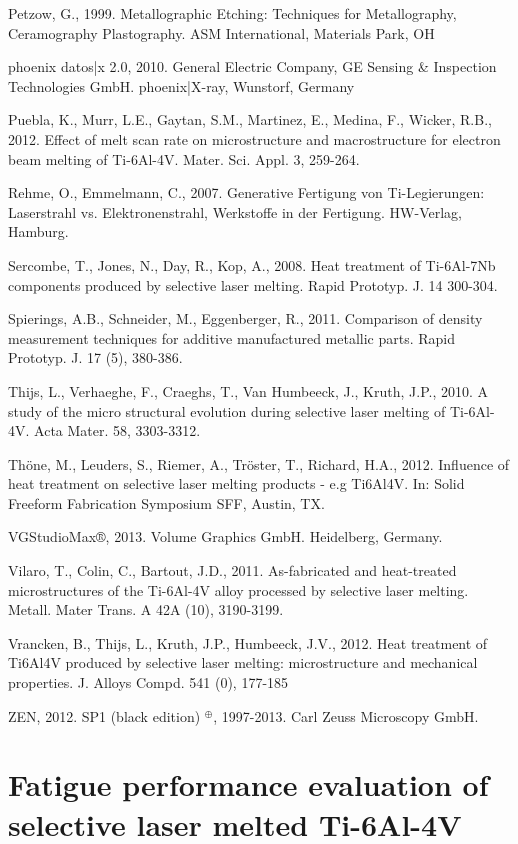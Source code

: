 \documentclass[10pt]{article}
\begin{document}
Petzow, G., 1999. Metallographic Etching: Techniques for Metallography, Ceramography Plastography. ASM International, Materials Park, $\mathrm{OH}$

phoenix datos|x 2.0, 2010. General Electric Company, GE Sensing \& Inspection Technologies GmbH. phoenix|X-ray, Wunstorf, Germany

Puebla, K., Murr, L.E., Gaytan, S.M., Martinez, E., Medina, F., Wicker, R.B., 2012. Effect of melt scan rate on microstructure and macrostructure for electron beam melting of Ti-6Al-4V. Mater. Sci. Appl. 3, 259-264.

Rehme, O., Emmelmann, C., 2007. Generative Fertigung von Ti-Legierungen: Laserstrahl vs. Elektronenstrahl, Werkstoffe in der Fertigung. HW-Verlag, Hamburg.

Sercombe, T., Jones, N., Day, R., Kop, A., 2008. Heat treatment of Ti-6Al-7Nb components produced by selective laser melting. Rapid Prototyp. J. 14 300-304.

Spierings, A.B., Schneider, M., Eggenberger, R., 2011. Comparison of density measurement techniques for additive manufactured metallic parts. Rapid Prototyp. J. 17 (5), 380-386.

Thijs, L., Verhaeghe, F., Craeghs, T., Van Humbeeck, J., Kruth, J.P., 2010. A study of the micro structural evolution during selective laser melting of Ti-6Al-4V. Acta Mater. 58, 3303-3312.

Thöne, M., Leuders, S., Riemer, A., Tröster, T., Richard, H.A., 2012. Influence of heat treatment on selective laser melting products - e.g Ti6Al4V. In: Solid Freeform Fabrication Symposium SFF, Austin, TX.

VGStudioMax®, 2013. Volume Graphics GmbH. Heidelberg, Germany.

Vilaro, T., Colin, C., Bartout, J.D., 2011. As-fabricated and heat-treated microstructures of the Ti-6Al-4V alloy processed by selective laser melting. Metall. Mater Trans. A 42A (10), 3190-3199.

Vrancken, B., Thijs, L., Kruth, J.P., Humbeeck, J.V., 2012. Heat treatment of Ti6Al4V produced by selective laser melting: microstructure and mechanical properties. J. Alloys Compd. 541 (0), 177-185

ZEN, 2012. SP1 (black edition) ${ }^{\oplus}$, 1997-2013. Carl Zeuss Microscopy GmbH.

\section*{Fatigue performance evaluation of selective laser melted Ti-6Al-4V }
\end{document}
